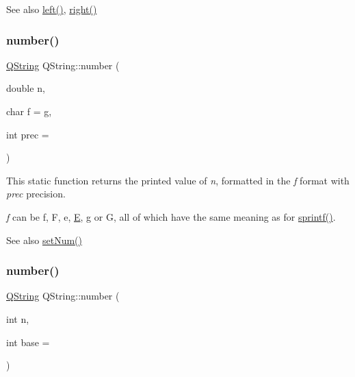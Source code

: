 \begin{DoxySeeAlso}{See also}
\mbox{\hyperlink{class_q_string_a02545407c8e65afbf6bd22324f9ed517}{left()}}, \mbox{\hyperlink{class_q_string_aa77ad91688915fed22e4150b00b5fd92}{right()}} 
\end{DoxySeeAlso}
\mbox{\label{class_q_string_a653e603580c5e150e99997e12ddaddf5}} 
\subsubsection{\texorpdfstring{number()}{number()}\hspace{0.1cm}{\footnotesize\ttfamily [1/5]}}
{\footnotesize\ttfamily \mbox{\hyperlink{class_q_string}{Q\+String}} Q\+String\+::number (\begin{DoxyParamCaption}\item[{double}]{n,  }\item[{char}]{f = {\ttfamily \textquotesingle{}g\textquotesingle{}},  }\item[{int}]{prec = {} }\end{DoxyParamCaption})\hspace{0.3cm}{\ttfamily [static]}}

This static function returns the printed value of {\itshape n}, formatted in the {\itshape f} format with {\itshape prec} precision.

{\itshape f} can be \textquotesingle{}f\textquotesingle{}, \textquotesingle{}F\textquotesingle{}, \textquotesingle{}e\textquotesingle{}, \textquotesingle{}\mbox{\hyperlink{class_e}{E}}\textquotesingle{}, \textquotesingle{}g\textquotesingle{} or \textquotesingle{}G\textquotesingle{}, all of which have the same meaning as for \mbox{\hyperlink{class_q_string_a0b6622a8335cdd080e8b1685b7e0fde0}{sprintf()}}.

\begin{DoxySeeAlso}{See also}
\mbox{\hyperlink{class_q_string_accbb06e3141abc70c20ccee59a20b1f5}{set\+Num()}} 
\end{DoxySeeAlso}
\mbox{\label{class_q_string_ac00103ffd860cbe3448ace2b490800cf}} 
\subsubsection{\texorpdfstring{number()}{number()}\hspace{0.1cm}{\footnotesize\ttfamily [2/5]}}
{\footnotesize\ttfamily \mbox{\hyperlink{class_q_string}{Q\+String}} Q\+String\+::number (\begin{DoxyParamCaption}\item[{int}]{n,  }\item[{int}]{base = {} }\end{DoxyParamCaption})\hspace{0.3cm}{\ttfamily [static]}}

